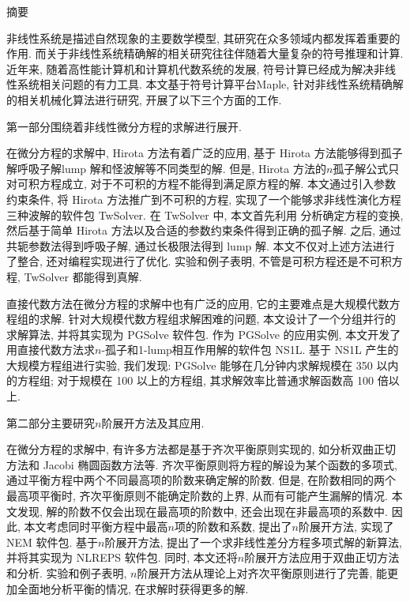{}
\centerline{\heiti 摘\quad 要}

\linespread{1.4} \bigskip

非线性系统是描述自然现象的主要数学模型, 其研究在众多领域内都发挥着重要的作用. 而关于非线性系统精确解的相关研究往往伴随着大量复杂的符号推理和计算. 近年来, 随着高性能计算机和计算机代数系统的发展, 符号计算已经成为解决非线性系统相关问题的有力工具. 本文基于符号计算平台Maple, 针对非线性系统精确解的相关机械化算法进行研究, 开展了以下三个方面的工作. 

第一部分围绕着非线性微分方程的求解进行展开. 

在微分方程的求解中, Hirota 方法有着广泛的应用, 基于 Hirota 方法能够得到孤子解\D 呼吸子解\D lump 解和怪波解等不同类型的解. 但是, Hirota 方法的$n$孤子解公式只对可积方程成立, 对于不可积的方程不能得到满足原方程的解. 本文通过引入参数约束条件, 将 Hirota 方法推广到不可积的方程, 实现了一个能够求非线性演化方程三种波解的软件包 TwSolver. 在 TwSolver 中, 本文首先利用 \Painleve{} 分析确定方程的变换, 然后基于简单 Hirota 方法以及合适的参数约束条件得到正确的孤子解. 之后, 通过共轭参数法得到呼吸子解, 通过长极限法得到 lump 解. 本文不仅对上述方法进行了整合, 还对编程实现进行了优化. 实验和例子表明, 不管是可积方程还是不可积方程, TwSolver 都能得到真解. 

直接代数方法在微分方程的求解中也有广泛的应用, 它的主要难点是大规模代数方程组的求解. 针对大规模代数方程组求解困难的问题, 本文设计了一个分组并行的求解算法, 并将其实现为 PGSolve 软件包. 作为 PGSolve 的应用实例, 本文开发了用直接代数方法求$n$-孤子和1-lump相互作用解的软件包 NS1L. 基于 NS1L 产生的大规模方程组进行实验, 我们发现: PGSolve 能够在几分钟内求解规模在 350 以内的方程组; 对于规模在 100 以上的方程组, 其求解效率比普通求解函数高 100 倍以上. 

第二部分主要研究$n$阶展开方法及其应用. 

在微分方程的求解中, 有许多方法都是基于齐次平衡原则实现的, 如\Painleve{}分析\D 双曲正切方法和 Jacobi 椭圆函数方法等. 齐次平衡原则将方程的解设为某个函数的多项式, 通过平衡方程中两个不同最高项的阶数来确定解的阶数. 但是, 在阶数相同的两个最高项平衡时, 齐次平衡原则不能确定阶数的上界, 从而有可能产生漏解的情况. 本文发现, 解的阶数不仅会出现在最高项的阶数中, 还会出现在非最高项的系数中. 因此, 本文考虑同时平衡方程中最高$n$项的阶数和系数, 提出了$n$阶展开方法, 实现了 NEM 软件包. 基于$n$阶展开方法, 提出了一个求非线性差分方程多项式解的新算法, 并将其实现为 NLREPS 软件包. 同时, 本文还将$n$阶展开方法应用于双曲正切方法和\Painleve{}分析. 实验和例子表明, $n$阶展开方法从理论上对齐次平衡原则进行了完善, 能更加全面地分析平衡的情况, 在求解时获得更多的解. 

